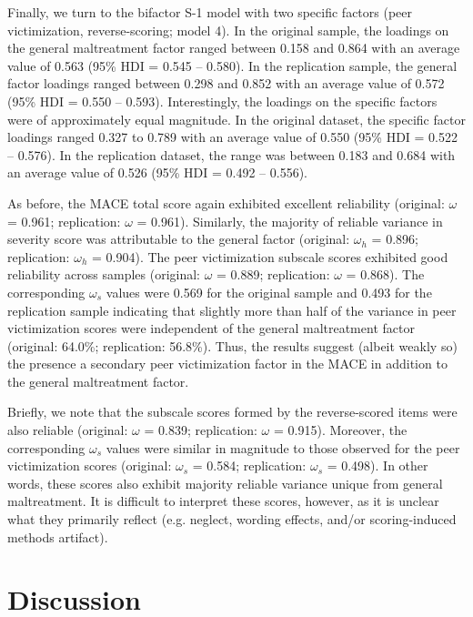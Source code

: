 \documentclass[letterpaper,man,natbib,noextraspace,floatsintext,longtable,12pt]{apa6}
\begin{document}
Finally, we turn to the bifactor S-1 model with two specific factors (peer victimization, reverse-scoring; model 4). In the original sample, the loadings on the general maltreatment factor ranged between 0.158 and 0.864 with an average value of 0.563 (95\% HDI = 0.545 -- 0.580). In the replication sample, the general factor loadings ranged between 0.298 and 0.852 with an average value of 0.572 (95\% HDI = 0.550 -- 0.593). Interestingly, the loadings on the specific factors were of approximately equal magnitude. In the original dataset, the specific factor loadings ranged 0.327 to 0.789 with an average value of 0.550 (95\% HDI = 0.522 -- 0.576). In the replication dataset, the range was between 0.183 and 0.684 with an average value of 0.526 (95\% HDI = 0.492 -- 0.556). 

As before, the MACE total score again exhibited excellent reliability (original: $\omega$ = 0.961; replication: $\omega$ = 0.961). Similarly, the majority of reliable variance in severity score was attributable to the general factor (original: $\omega_h$ = 0.896; replication: $\omega_h$ = 0.904). The peer victimization subscale scores exhibited good reliability across samples (original: $\omega$ = 0.889; replication: $\omega$ = 0.868). The corresponding $\omega_s$ values were 0.569 for the original sample and 0.493 for the replication sample indicating that slightly more than half of the variance in peer victimization scores were independent of the general maltreatment factor (original: 64.0\%; replication: 56.8\%). Thus, the results suggest (albeit weakly so) the presence a secondary peer victimization factor in the MACE in addition to the general maltreatment factor. 

Briefly, we note that the subscale scores formed by the reverse-scored items were also reliable (original: $\omega$ = 0.839; replication: $\omega$ = 0.915). Moreover, the corresponding $\omega_s$ values were similar in magnitude to those observed for the peer victimization scores (original: $\omega_s$ = 0.584; replication: $\omega_s$ = 0.498). In other words, these scores also exhibit majority reliable variance unique from general maltreatment. It is difficult to interpret these scores, however, as it is unclear what they primarily reflect (e.g. neglect, wording effects, and/or scoring-induced methods artifact). 

\section{Discussion}
\end{document}
